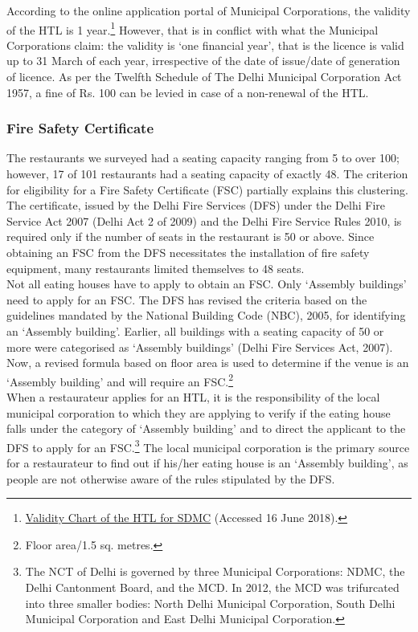 \documentclass[a4paper, 12pt]{article}
\begin{document}
                    According to the online application portal of Municipal Corporations, the validity of the HTL is 1 year.\footnote{\href{https://bit.ly/2Qzd92r}{Validity Chart of the HTL for SDMC} (Accessed 16 June 2018).} However, that is in conflict with what the Municipal Corporations claim: the validity is ‘one financial year’, that is the licence is valid up to 31 March of each year, irrespective of the date of issue/date of generation of licence. As per the Twelfth Schedule of The Delhi Municipal Corporation Act 1957, a fine of Rs. 100 can be levied in case of a non-renewal of the HTL. %
  
     
		\subsubsection{Fire Safety Certificate}
		The restaurants we surveyed had a seating capacity ranging from 5 to over 100; however, 17 of 101 restaurants had a seating capacity of exactly 48. The criterion for eligibility for a Fire Safety Certificate (FSC) partially explains this clustering. The 
certificate, issued by the Delhi Fire Services (DFS) under the Delhi Fire Service Act 2007 (Delhi Act 2 of 2009) and the Delhi Fire Service Rules 2010, is required only if the number of seats in the restaurant is 50 or above. Since obtaining an FSC from the DFS 
necessitates the installation of fire safety equipment, many restaurants limited themselves to 48 seats. \\ %
		
		Not all eating houses have to apply to obtain an FSC. Only ‘Assembly buildings’ need to apply for an FSC. The DFS has revised the criteria based on the guidelines mandated by the National Building Code (NBC), 2005, for identifying an ‘Assembly 
building’. Earlier, all buildings with a seating capacity of 50 or more were categorised as ‘Assembly buildings’ (Delhi Fire Services Act, 2007). Now, a revised formula based on floor area is used to determine if the venue is an ‘Assembly building’ and will require an 
FSC.\footnote{Floor area/1.5 sq. metres.} \\
		
		When a restaurateur applies for an HTL, it is the responsibility of the local municipal corporation to which they are applying to verify if the eating house falls under the category of ‘Assembly building’ and to direct the applicant to the DFS to apply for an 
FSC.\footnote{The NCT of Delhi is governed by three Municipal Corporations: NDMC, the Delhi Cantonment Board, and the MCD. In 2012, the MCD was trifurcated into three smaller bodies: North Delhi Municipal Corporation, South Delhi Municipal Corporation 
and East Delhi Municipal Corporation.} The local municipal corporation is the primary source for a restaurateur to find out if his/her eating house is an ‘Assembly building’, as people are not otherwise aware of the rules stipulated by the DFS. \\ %
		
\end{document}
